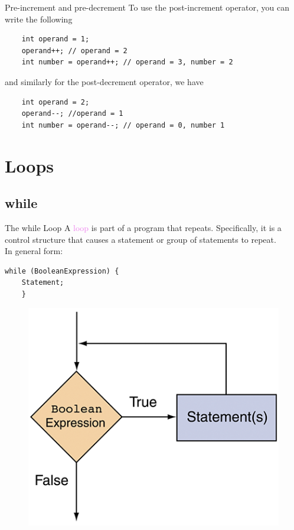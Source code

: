 \documentclass[11pt]{beamer}
\newcommand{\violet}[1]{\textcolor{violet}{#1}}
\begin{document}
\begin{frame}[fragile]{Pre-increment and pre-decrement}
    To use the post-increment operator, you can write the following
    \begin{lstlisting}
    int operand = 1;
    operand++; // operand = 2
    int number = operand++; // operand = 3, number = 2
    \end{lstlisting}
    and similarly for the post-decrement operator, we have
    \begin{lstlisting}
    int operand = 2;
    operand--; //operand = 1
    int number = operand--; // operand = 0, number 1
    \end{lstlisting}    
\end{frame}

\section{Loops}
\subsection{while}
\begin{frame}[fragile]{The while Loop}
    A \violet{loop} is part of a program that repeats. Specifically, it is a control structure that causes a statement or group of statements to repeat. \\
    \vspace{1em} 
    In general form:
    \begin{lstlisting}
while (BooleanExpression) {
    Statement;
    }
    \end{lstlisting}
    \begin{figure}[H]
    \centering
    \includegraphics[scale=0.2]{Images/chapter04_whileLoop.png}
    \end{figure}
\end{frame}
\end{document}
